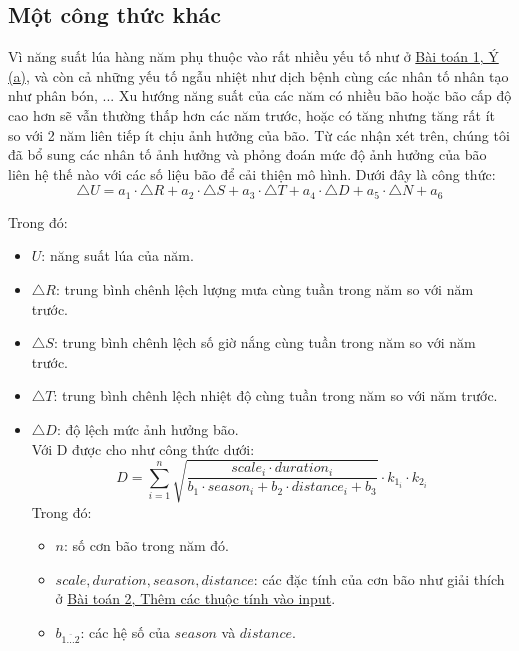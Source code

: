 \documentclass[12pt]{report}
\begin{document}
\subsection{Một công thức khác}
\begin{flushleft}
	Vì năng suất lúa hàng năm phụ thuộc vào rất nhiều yếu tố như ở \textcolor{blue}{\hyperlink{section.1.1}{Bài toán 1, Ý (a)}}, và còn cả những yếu tố ngẫu nhiệt như dịch bệnh cùng các nhân tố nhân tạo như phân bón, ... Xu hướng năng suất của các năm có nhiều bão hoặc bão cấp độ cao hơn sẽ vẫn thường thấp hơn các năm trước, hoặc có tăng nhưng tăng rất ít so với 2 năm liên tiếp ít chịu ảnh hưởng của bão. Từ các nhận xét trên, chúng tôi đã bổ sung các nhân tố ảnh hưởng và phỏng đoán mức độ ảnh hưởng của bão liên hệ thế nào với các số liệu bão để cải thiện mô hình. Dưới đây là công thức:
	$$
		\triangle{U} = a_{1} \cdot \triangle{R} + a_{2} \cdot \triangle{S} + a_{3} \cdot \triangle{T} + a_{4} \cdot \triangle{D} + a_{5} \cdot \triangle{N} + a_{6}
	$$

	Trong đó:
	\begin{itemize}
		\item $U$: năng suất lúa của năm.

		\item $\triangle{R}$: trung bình chênh lệch lượng mưa cùng tuần trong năm so với năm trước.

		\item $\triangle{S}$: trung bình chênh lệch số giờ nắng cùng tuần trong năm so với năm trước.

		\item $\triangle{T}$: trung bình chênh lệch nhiệt độ cùng tuần trong năm so với năm trước.

		\item $\triangle{D}$: độ lệch mức ảnh hưởng bão.
		\\
		Với D được cho như công thức dưới:
		$$
			D = \sum\limits_{i = {1}}^{n} \sqrt{\frac{scale_{i} \cdot duration_{i}}{b_{1} \cdot season_{i} + b_{2} \cdot distance_{i} + b_{3}}} \cdot k_{{1}_{i}} \cdot k_{{2}_{i}}
		$$
		Trong đó:
		\begin{itemize}
			\item $n$: số cơn bão trong năm đó.

			\item $scale, duration, season, distance$: các đặc tính của cơn bão như giải thích ở \textcolor{blue}{\hyperlink{subsection.2.3.2}{Bài toán 2, Thêm các thuộc tính vào input}}.

			\item $b^{}_{\overline{1 \dots 2}}$: các hệ số của $season$ và $distance$.


\end{itemize}
\end{itemize}
\end{flushleft}
\end{document}
